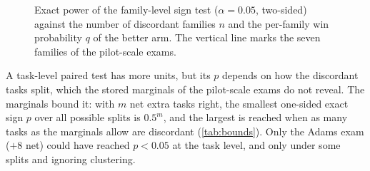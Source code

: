 \begin{figure}[t]
\centering
{}
\caption{Exact power of the family-level sign test ($\alpha=0.05$, two-sided) against the
number of discordant families $n$ and the per-family win probability $q$ of the better
arm. The vertical line marks the seven families of the pilot-scale exams.}
\label{fig:power}
\end{figure}

A task-level paired test has more units, but its $p$ depends on how the discordant tasks
split, which the stored marginals of the pilot-scale exams do not reveal. The marginals
bound it: with $m$ net extra tasks right, the smallest one-sided exact sign $p$ over all
possible splits is $0.5^m$, and the largest is reached when as many tasks as the marginals
allow are discordant (\cref{tab:bounds}). Only the Adams exam ($+8$ net) could have reached
$p<0.05$ at the task level, and only under some splits and ignoring clustering.

